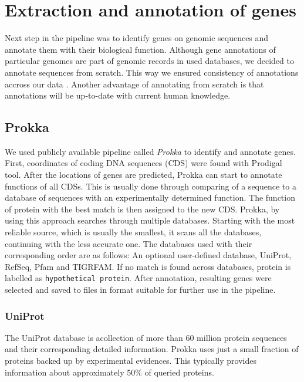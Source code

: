\section{Extraction and annotation of genes}
Next step in the pipeline was to identify genes on genomic sequences and annotate them with their biological function.
Although gene annotations of particular genomes are part of genomic records in used databases, we decided to annotate sequences from scratch.
This way we ensured consistency of annotations accross our data .
Another advantage of annotating from scratch is that annotations will be up-to-date with current human knowledge.

\subsection{Prokka}
We used publicly available pipeline called \emph{Prokka} \cite{prokka} to identify and annotate genes.
First, coordinates of coding DNA sequences (CDS) were found with Prodigal tool\cite{prodigal}.
After the locations of genes are predicted, Prokka can start to annotate functions of all CDSs.
This is usually done through comparing of a sequence to a database of sequences with an experimentally determined function.
The function of protein with the best match is then assigned to the new CDS.
Prokka, by using this approach searches through multiple databases.
Starting with the most reliable source, which is usually the smallest, it scans all the databases, continuing with the less accurate one.
The databases used with their corresponding order are as follows:
An optional user-defined database, UniProt\cite{uniprot}, RefSeq\cite{refseq}, Pfam\cite{pfam} and TIGRFAM\cite{tigrfam}.
If no match is found across databases, protein is labelled as \verb|hypothetical protein|.
After annotation, resulting genes were selected and saved to files in format suitable for further use in the pipeline.


\subsubsection{UniProt}
The UniProt database is acollection of more than 60 million protein sequences and their corresponding detailed information.
Prokka uses just a small fraction of proteins backed up by experimental evidences.
This typically provides information about approximately 50\% of queried proteins.

